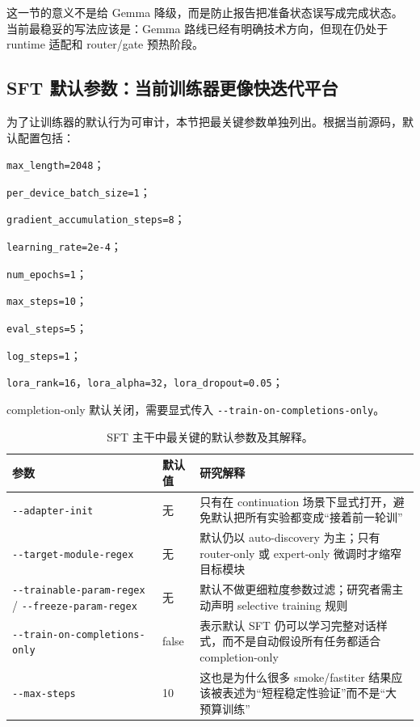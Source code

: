 \documentclass[11pt,a4paper]{article}
\newcommand{\code}[1]{\begingroup\ttfamily\footnotesize\nolinkurl{#1}\endgroup}
\begin{document}
这一节的意义不是给 Gemma 降级，而是防止报告把准备状态误写成完成状态。当前最稳妥的写法应该是：Gemma 路线已经有明确技术方向，但现在仍处于 runtime 适配和 router/gate 预热阶段。

\subsection{SFT 默认参数：当前训练器更像快迭代平台}

为了让训练器的默认行为可审计，本节把最关键参数单独列出。根据当前源码，默认配置包括：

  \par \code{max\_length=2048}；
  \par \code{per\_device\_batch\_size=1}；
  \par \code{gradient\_accumulation\_steps=8}；
  \par \code{learning\_rate=2e-4}；
  \par \code{num\_epochs=1}；
  \par \code{max\_steps=10}；
  \par \code{eval\_steps=5}；
  \par \code{log\_steps=1}；
  \par \code{lora\_rank=16}，\code{lora\_alpha=32}，\code{lora\_dropout=0.05}；
  \par completion-only 默认关闭，需要显式传入 \code{--train-on-completions-only}。

\begin{table}[htbp]
\centering
\small
\begin{tabularx}{\textwidth}{p{3.0cm} p{2.0cm} Y}
\toprule
参数 & 默认值 & 研究解释 \\
\midrule
\code{--adapter-init} & 无 & 只有在 continuation 场景下显式打开，避免默认把所有实验都变成“接着前一轮训” \\
\code{--target-module-regex} & 无 & 默认仍以 auto-discovery 为主；只有 router-only 或 expert-only 微调时才缩窄目标模块 \\
\code{--trainable-param-regex} / \code{--freeze-param-regex} & 无 & 默认不做更细粒度参数过滤；研究者需主动声明 selective training 规则 \\
\code{--train-on-completions-only} & false & 表示默认 SFT 仍可以学习完整对话样式，而不是自动假设所有任务都适合 completion-only \\
\code{--max-steps} & 10 & 这也是为什么很多 smoke/fastiter 结果应该被表述为“短程稳定性验证”而不是“大预算训练” \\
\bottomrule
\end{tabularx}
\caption{SFT 主干中最关键的默认参数及其解释。}
\label{tab:sft-defaults}
\end{table}
\end{document}
